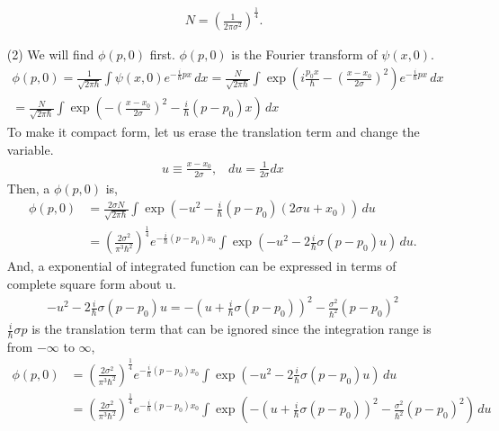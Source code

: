 \documentclass[floatfix,nofootinbib,superscriptaddress,fleqn]{revtex4}
\begin{document}
\begin{itemize}
  \begin{align}
    \,N = {\left(\frac{1}{2\pi\sigma^2}\right)}^{\frac{1}{4}}.
  \end{align}
  \item[(2)]  We will find $\phi(p,0)$ first. 
  $\phi(p,0)$ is the Fourier transform of $\psi(x,0)$.
  \begin{align}
    \phi(p,0)=\frac{1}{\sqrt{2\pi\hbar}}
    \int\psi(x,0) e^{-\frac{i}{\hbar}px}\,dx
      =\frac{N}{\sqrt{2\pi\hbar}}
      \int\exp\left(i\frac{p_0 x}{\hbar}-{\left(
        \frac{x-x_0}{2\sigma}\right)}^2\right) 
      e^{-\frac{i}{\hbar}px}\,dx  \\
      =\frac{N}{\sqrt{2\pi\hbar}}
      \int\exp\left(-{\left(\frac{x-x_0}{2\sigma}\right)}^2
      -\frac{i}{\hbar}(p-p_0)x\right)\,dx
  \end{align}
  To make it compact form, let us erase the translation term 
  and change the variable.
  \begin{align}
    u \equiv \frac{x-x_0}{2\sigma},\;\;\; du = \frac{1}{2\sigma} dx 
  \end{align}
  Then, a $\phi(p,0)$ is,
  \begin{align}
    \phi(p,0)&=\frac{2\sigma N}{\sqrt{2\pi\hbar}}
    \int\exp\left(-{u}^2-\frac{i}{\hbar}(p-p_0)(2\sigma u+x_0)\right)\,du \\
    &={\left(\frac{2\sigma^2}{\pi^3\hbar^2}\right)}^{\frac{1}{4}}
    e^{-\frac{i}{\hbar}(p-p_0)x_0}
    \int\exp\left(-u^2-2\frac{i}{\hbar}\sigma (p-p_0)u\right)\,du.
  \end{align}
  And, a exponential of integrated function can be expressed 
  in terms of complete square form about u.
  \begin{align}
    -u^2-2\frac{i}{\hbar}\sigma (p-p_0)u 
    = -{\left( u+\frac{i}{\hbar}\sigma (p-p_0)\right)}^2
    -\frac{\sigma^2}{\hbar^2}{(p-p_0)}^2
  \end{align}
  $\frac{i}{\hbar}\sigma p$ is the translation term that can be ignored 
  since the integration range is from $-\infty$ to $\infty$,
  \begin{align}
    \phi(p,0) &= {\left(\frac{2\sigma^2}{\pi^3\hbar^2}\right)}^{\frac{1}{4}}
    e^{-\frac{i}{\hbar}(p-p_0)x_0}
    \int\exp\left(-u^2-2\frac{i}{\hbar}\sigma (p-p_0)u\right)\,du \\
    &={\left(\frac{2\sigma^2}{\pi^3\hbar^2}\right)}^{\frac{1}{4}}
    e^{-\frac{i}{\hbar}(p-p_0)x_0}  
    \int\exp\left(-{\left( u+\frac{i}{\hbar}\sigma (p-p_0)\right)}^2
    -\frac{\sigma^2}{\hbar^2}(p-p_0)^2\right)\,du \\

\end{align}
\end{itemize}
\end{document}
